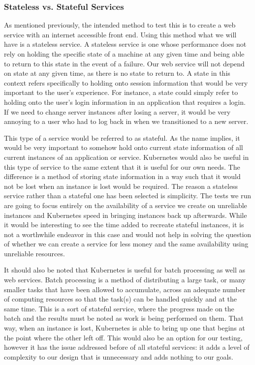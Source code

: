 \documentclass[thesis,proposal]{umassthesis}  %
\begin{document}
\subsubsection{Stateless vs. Stateful Services}
	As mentioned previously, the intended method to test this is to create a web service with an internet accessible front end. Using this method what we will have is a stateless service. A stateless service is one whose performance does not rely on holding the specific state of a machine at any given time and being able to return to this state in the event of a failure. Our web service will not depend on state at any given time, as there is no state to return to. A state in this context refers specifically to holding onto session information that would be very important to the user’s experience. For instance, a state could simply refer to holding onto the user’s login information in an application that requires a login. If we need to change server instances after losing a server, it would be very annoying to a user who had to log back in when we transitioned to a new server.\par
	This type of a service would be referred to as stateful. As the name implies, it would be very important to somehow hold onto current state information of all current instances of an application or service. Kubernetes would also be useful in this type of service to the same extent that it is useful for our own needs. The difference is a method of storing state information in a way such that it would not be lost when an instance is lost would be required. The reason a stateless service rather than a stateful one has been selected is simplicity. The tests we run are going to focus entirely on the availability of a service we create on unreliable instances and Kubernetes speed in bringing instances back up afterwards. While it would be interesting to see the time added to recreate stateful instances, it is not a worthwhile endeavor in this case and would not help in solving the question of whether we can create a service for less money and the same availability using unreliable resources.\par
	It should also be noted that Kubernetes is useful for batch processing as well as web services. Batch processing is a method of distributing a large task, or many smaller tasks that have been allowed to accumulate, across an adequate number of computing resources so that the task(s) can be handled quickly and at the same time. This is a sort of stateful service, where the progress made on the batch and the results must be noted as work is being performed on them. That way, when an instance is lost, Kubernetes is able to bring up one that begins at the point where the other left off. This would also be an option for our testing, however it has the issue addressed before of all stateful services: it adds a level of complexity to our design that is unnecessary and adds nothing to our goals.
\end{document}
